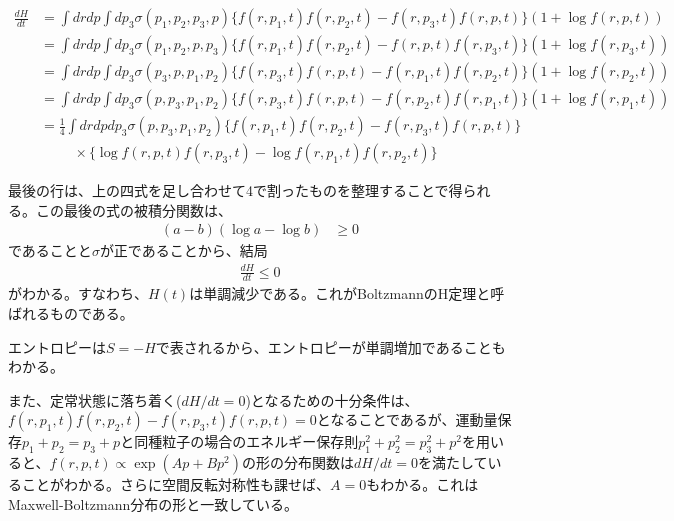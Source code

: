 \documentclass[uplatex,dvipdfmx]{jsarticle}
\begin{document}
\begin{align}
    \frac{dH}{dt} &= \int drdp \int dp_3 \sigma(p_1,p_2,p_3,p) \{f(r,p_1,t)f(r,p_2,t)-f(r, p_3, t)f(r, p,t)\}(1+\log f(r,p,t)) \\ 
        &= \int drdp \int dp_3 \sigma(p_1,p_2,p,p_3) \{f(r,p_1,t)f(r,p_2,t)-f(r, p, t)f(r, p_3,t)\}(1+\log f(r,p_3,t)) \\
        &= \int drdp \int dp_3 \sigma(p_3,p,p_1,p_2) \{f(r,p_3,t)f(r,p,t)-f(r, p_1, t)f(r, p_2,t)\}(1+\log f(r,p_2,t)) \\
        &= \int drdp \int dp_3 \sigma(p,p_3,p_1,p_2) \{f(r,p_3,t)f(r,p,t)-f(r, p_2, t)f(r, p_1,t)\}(1+\log f(r,p_1,t)) \\
        &= \frac{1}{4} \int drdpdp_3 \sigma(p,p_3,p_1,p_2)
            \{ f(r,p_1,t)f(r,p_2,t) - f(r,p_3,t)f(r,p,t) \} \\
        & \hspace{1cm} \times \{\log f(r,p,t)f(r,p_3,t)- \log f(r,p_1,t)f(r,p_2,t)\}
\end{align}

最後の行は、上の四式を足し合わせて4で割ったものを整理することで得られる。この最後の式の被積分関数は、
\begin{align*}
    (a-b)(\log a-\log b) &\geq 0 
\end{align*}
であることと$\sigma$が正であることから、結局
\begin{align}
    \frac{dH}{dt} \leq 0    
\end{align}
がわかる。すなわち、$H(t)$は単調減少である。これがBoltzmannのH定理と呼ばれるものである。

エントロピーは$S=-H$で表されるから、エントロピーが単調増加であることもわかる。

また、定常状態に落ち着く($dH/dt = 0$)となるための十分条件は、$f(r,p_1,t)f(r,p_2,t) - f(r,p_3,t)f(r,p,t)=0 $となることであるが、運動量保存$p_1+p_2 = p_3 + p$と同種粒子の場合のエネルギー保存則$p_1^2+p_2^2 = p_3^2+p^2$を用いると、$f(r,p,t)\propto \exp(Ap+Bp^2)$の形の分布関数は$dH/dt=0$を満たしていることがわかる。さらに空間反転対称性も課せば、$A=0$もわかる。これはMaxwell-Boltzmann分布の形と一致している。
\end{document}
